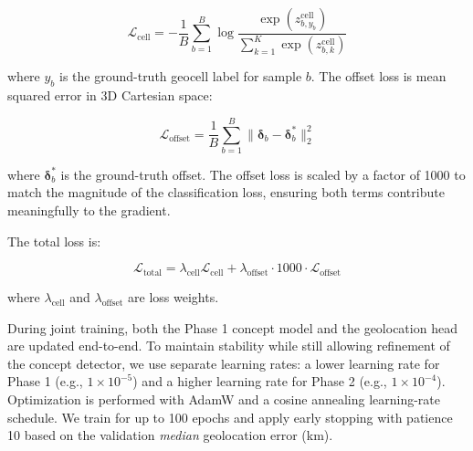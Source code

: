 \documentclass{article}
\begin{document}
\begin{equation}
\mathcal{L}_{\text{cell}} = -\frac{1}{B} \sum_{b=1}^{B} \log \frac{\exp(z_{b,y_b}^{\text{cell}})}{\sum_{k=1}^{K} \exp(z_{b,k}^{\text{cell}})}
\end{equation}

where $y_b$ is the ground-truth geocell label for sample $b$. The offset loss is mean squared error in 3D Cartesian space:

\begin{equation}
\mathcal{L}_{\text{offset}} = \frac{1}{B} \sum_{b=1}^{B} \|\boldsymbol{\delta}_b - \boldsymbol{\delta}_b^*\|_2^2
\end{equation}

where $\boldsymbol{\delta}_b^*$ is the ground-truth offset. The offset loss is scaled by a factor of 1000 to match the magnitude of the classification loss, ensuring both terms contribute meaningfully to the gradient.

The total loss is:

\begin{equation}
\mathcal{L}_{\text{total}} = \lambda_{\text{cell}} \mathcal{L}_{\text{cell}} + \lambda_{\text{offset}} \cdot 1000 \cdot \mathcal{L}_{\text{offset}}
\end{equation}

where $\lambda_{\text{cell}}$ and $\lambda_{\text{offset}}$ are loss weights. 




During joint training, both the Phase 1 concept model and the geolocation head are updated end-to-end. To maintain stability while still allowing refinement of the concept detector, we use separate learning rates: a lower learning rate for Phase 1 (e.g., $1\times 10^{-5}$) and a higher learning rate for Phase 2 (e.g., $1\times 10^{-4}$). Optimization is performed with AdamW and a cosine annealing learning-rate schedule. We train for up to 100 epochs and apply early stopping with patience 10 based on the validation \emph{median} geolocation error (km).
\end{document}
